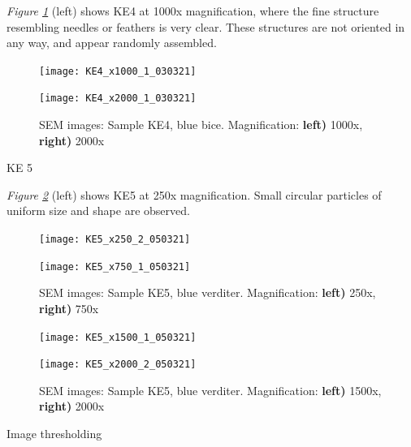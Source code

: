 \textit{Figure \ref{fig:KE4_sem_2}} (left) shows KE4 at 1000x magnification, where the fine structure resembling needles or feathers is very clear. These structures are not oriented in any way, and appear randomly assembled.

\begin{figure}[H]
\centering
\begin{minipage}{.45\textwidth}
  \centering
  \texttt{[image: KE4\_x1000\_1\_030321]}
\end{minipage}
\begin{minipage}{.45\textwidth}
  \centering
  \texttt{[image: KE4\_x2000\_1\_030321]}
\end{minipage}
\caption[SEM images: Sample KE4, blue bice]{SEM images: Sample KE4, blue bice. Magnification: \textbf{left)} 1000x, \textbf{right)} 2000x}
\label{fig:KE4_sem_2}
\end{figure}

KE 5

\textit{Figure \ref{fig:KE5_sem_1}} (left) shows KE5 at 250x magnification. Small circular particles of uniform size and shape are observed.

\begin{figure}[H]
\centering
\begin{minipage}{.45\textwidth}
  \centering
  \texttt{[image: KE5\_x250\_2\_050321]}
\end{minipage}
\begin{minipage}{.45\textwidth}
  \centering
  \texttt{[image: KE5\_x750\_1\_050321]}
\end{minipage}
\caption[SEM images: Sample KE5, blue verditer]{SEM images: Sample KE5, blue verditer. Magnification: \textbf{left)} 250x, \textbf{right)} 750x}
\label{fig:KE5_sem_1}
\end{figure}

\begin{figure}[H]
\centering
\begin{minipage}{.45\textwidth}
  \centering
  \texttt{[image: KE5\_x1500\_1\_050321]}
\end{minipage}
\begin{minipage}{.45\textwidth}
  \centering
  \texttt{[image: KE5\_x2000\_2\_050321]}
\end{minipage}
\caption[SEM images: Sample KE5, blue verditer]{SEM images: Sample KE5, blue verditer. Magnification: \textbf{left)} 1500x, \textbf{right)} 2000x}
\label{fig:KE5_sem_2}
\end{figure}


Image thresholding


